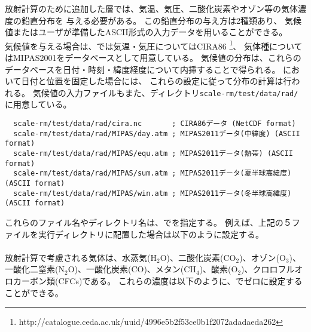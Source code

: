 放射計算のために追加した層では、気温、気圧、二酸化炭素やオゾン等の気体濃度の鉛直分布を
与える必要がある。
この鉛直分布の与え方は2種類あり、
気候値またはユーザが準備したASCII形式の入力データを用いることができる。\\

気候値を与える場合は、\scalerm では気温・気圧についてはCIRA86
\footnote{http://catalogue.ceda.ac.uk/uuid/4996e5b2f53ce0b1f2072adadaeda262}\citep{CSR_2006}、
気体種についてはMIPAS2001\citep{Remedios_2007}をデータベースとして用意している。
気候値の分布は、これらのデータベースを日付・時刻・緯度経度について内挿することで得られる。
において日付と位置を固定した場合には、
これらの設定に従って分布の計算は行われる。
気候値の入力ファイルもまた、ディレクトリ\verb|scale-rm/test/data/rad/|に用意している。
\begin{verbatim}
  scale-rm/test/data/rad/cira.nc       ; CIRA86データ (NetCDF format)
  scale-rm/test/data/rad/MIPAS/day.atm ; MIPAS2011データ(中緯度) (ASCII format)
  scale-rm/test/data/rad/MIPAS/equ.atm ; MIPAS2011データ(熱帯) (ASCII format)
  scale-rm/test/data/rad/MIPAS/sum.atm ; MIPAS2011データ(夏半球高緯度) (ASCII format)
  scale-rm/test/data/rad/MIPAS/win.atm ; MIPAS2011データ(冬半球高緯度) (ASCII format)
\end{verbatim}
これらのファイル名やディレクトリ名は、でを指定する。
例えば、上記の５ファイルを実行ディレクトリに配置した場合は以下のように設定する。\\

\\

放射計算で考慮される気体は、水蒸気(H$_{2}$O)、二酸化炭素(CO$_{2}$)、オゾン(O$_{3}$)、一酸化二窒素(N$_{2}$O)、一酸化炭素(CO)、メタン(CH$_{4}$)、酸素(O$_{2}$)、クロロフルオロカーボン類(CFCs)である。
これらの濃度は以下のように、でゼロに設定することができる。\\

